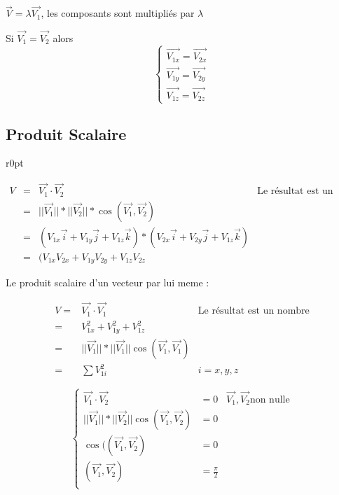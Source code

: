 
$\vec{V} = \lambda\vec{V_1}$, les composants sont multipliés par $\lambda$

Si $\vec{V_1} = \vec{V_2}$ alors 
\[
	\left\{
		\begin{array}{c}
			\vec{V_{1x}} = \vec{V_{2x}}\\
			\vec{V_{1y}} = \vec{V_{2y}}\\
			\vec{V_{1z}} = \vec{V_{2z}}
		\end{array}
	\right.
\]

\subsection{Produit Scalaire}
\begin{wrapfigure}[5]{r}{0pt}
\end{wrapfigure}
\begin{align*}
	V &=& \vec{V_1} \cdot \vec{V_2} & \text{Le résultat est un nombre}\\
			&=& ||\vec{V_1}||*||\vec{V_2}||*\cos(\vec{V_1}, \vec{V_2})\\
			&=& (V_{1x}\vec{i} + V_{1y}\vec{j} + V_{1z}\vec{k})*(V_{2x}\vec{i} + V_{2y}\vec{j} + V_{1z}\vec{k}) \\
			&=&	(V_{1x}V_{2x} + V_{1y}V_{2y}+V_{1z}V_{2z}
\end{align*}


Le produit scalaire d'un vecteur par lui meme :

\begin{align*}
			V =& \vec{V_1} \cdot \vec{V_1} & \text{Le résultat est un nombre}\\
	=& V_{1x}^2 + V_{1y}^2 + V_{1z}^2 \\
	=& ||\vec{V_1}||*||\vec{V_1}||\cos(\vec{V_1}, \vec{V_1}) \\
	=& \sum V_{1i}^2 & i=x, y, z
\end{align*}


\[
	\left\{
		\begin{array}{rlr}
			\vec{V_1} \cdot \vec{V_2} &= 0 & \vec{V_1}, \vec{V_2} \text{non nulle} \\
			||\vec{V_1}||*||\vec{V_2}||\cos(\vec{V_1}, \vec{V_2}) &= 0 \\
			\cos((\vec{V_1}, \vec{V_2}) &= 0 \\
			(\vec{V_1}, \vec{V_2}) &= \frac{\pi}{2} \\
		\end{array}
	\right.
\]

